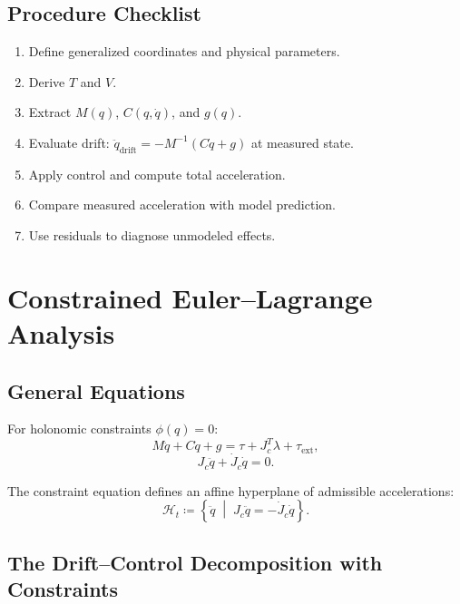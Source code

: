 \documentclass[11pt]{article}
\begin{document}
\subsection{Procedure Checklist}

\begin{enumerate}
\item Define generalized coordinates and physical parameters.
\item Derive $T$ and $V$.
\item Extract $M(q)$, $C(q,\dot{q})$, and $g(q)$.
\item Evaluate drift: $\ddot{q}_{\mathrm{drift}} = -M^{-1}(C\dot{q}+g)$ at measured state.
\item Apply control and compute total acceleration.
\item Compare measured acceleration with model prediction.
\item Use residuals to diagnose unmodeled effects.
\end{enumerate}


\section{Constrained Euler--Lagrange Analysis}\label{sec:constrained-el}

\subsection{General Equations}

For holonomic constraints $\phi(q)=0$:
\begin{equation}\label{eq:cel-dynamics}
M\ddot{q} + C\dot{q} + g = \tau + J_c^T\lambda + \tau_{\mathrm{ext}},
\end{equation}
\begin{equation}\label{eq:cel-constraint}
J_c\ddot{q} + \dot{J}_c\dot{q} = 0.
\end{equation}

The constraint equation defines an affine hyperplane of admissible accelerations:
\begin{equation}\label{eq:hyperplane}
\mathcal{H}_t \coloneqq \left\{\ddot{q}\;\middle|\;J_c\ddot{q} = -\dot{J}_c\dot{q}\right\}.
\end{equation}

\subsection{The Drift--Control Decomposition with Constraints}
\end{document}
